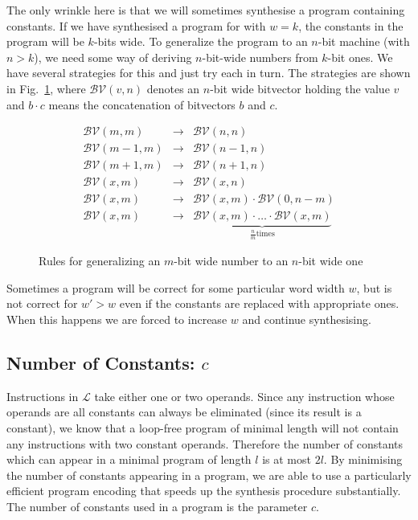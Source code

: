 \documentclass[a4paper]{llncs}
\newcommand{\bv}[2]{\mathcal{BV}(#1, #2)}
\begin{document}
The only wrinkle here is that we will sometimes synthesise a program containing
constants.  If we have synthesised a program for with $w=k$,
the constants in the program will be $k$-bits wide.  To generalize the program
to an $n$-bit machine (with $n > k$), we need some way of deriving $n$-bit-wide
numbers from $k$-bit ones.  We have several strategies for this and
just try each in turn.  The strategies are shown in Fig.~\ref{fig:generalize},
where $\mathcal{BV}(v, n)$ denotes an $n$-bit wide bitvector holding the value $v$
and $b \cdotp c$ means the concatenation of bitvectors $b$ and $c$.

\begin{figure}

\begin{eqnarray*}
 \bv{m}{m} & \rightarrow & \bv{n}{n} \\
 \bv{m-1}{m} & \rightarrow & \bv{n-1}{n} \\
 \bv{m+1}{m} & \rightarrow & \bv{n+1}{n} \\
 \bv{x}{m} & \rightarrow & \bv{x}{n} \\
 \bv{x}{m} & \rightarrow & \bv{x}{m} \cdotp \bv{0}{n - m} \\
 \bv{x}{m} & \rightarrow & \underbrace{\bv{x}{m} \cdotp \ldots \cdotp \bv{x}{m}}_{\frac{n}{m} \mathrm{ times}}
\end{eqnarray*}

\caption{Rules for generalizing 
an $m$-bit wide number to an $n$-bit wide one
 \label{fig:generalize}}
\end{figure}

Sometimes a program will be correct for some particular word width $w$, but is
not correct for $w' > w$ even if the constants are replaced with appropriate ones.
When this happens we are forced to increase $w$ and continue synthesising.

\subsection{Number of Constants: $c$}
Instructions in $\mathcal{L}$ take either one or two operands.
Since any instruction whose operands are all constants can always be
eliminated (since its result is a constant), we know that a loop-free program
of minimal length will not contain any instructions with two constant
operands.  Therefore the number of constants which can appear in
a minimal program of length $l$ is at most $2l$.  By minimising the number
of constants appearing in a program, we are able to use a particularly
efficient program encoding that speeds up the synthesis procedure
substantially.  The number of constants used in a program is the parameter $c$.
\end{document}
